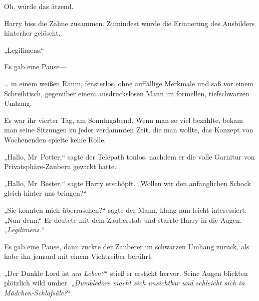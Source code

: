 Oh, würde das ätzend.

Harry biss die Zähne zusammen. Zumindest würde die Erinnerung des Ausbilders hinterher gelöscht.

„Legilimens.“

Es gab eine Pause—

\later

… in einem weißen Raum, fensterlos, ohne auffällige Merkmale und saß vor einem Schreibtisch, gegenüber einem ausdruckslosen Mann im formellen, tiefschwarzen Umhang.

Es war ihr vierter Tag, am Sonntagabend. Wenn man so viel bezahlte, bekam man seine Sitzungen zu jeder verdammten Zeit, die man wollte, das Konzept von Wochenenden spielte keine Rolle.

„Hallo, Mr~Potter,“ sagte der Telepath tonlos, nachdem er die volle Garnitur von Privatsphäre-Zaubern gewirkt hatte.

„Hallo, Mr~Bester,“ sagte Harry erschöpft. „Wollen wir den anfänglichen Schock gleich hinter uns bringen?“

„Sie konnten mich überraschen?“ sagte der Mann, klang nun leicht interessiert. „Nun denn.“ Er deutete mit dem Zauberstab und starrte Harry in die Augen. „\emph{Legilimens.}“

Es gab eine Pause, dann zuckte der Zauberer im schwarzen Umhang zurück, als habe ihn jemand mit einem Viehtreiber berührt.

„Der Dunkle Lord ist \emph{am Leben?}“ stieß er erstickt hervor. Seine Augen blickten plötzlich wild umher. „\emph{Dumbledore macht sich unsichtbar und schleicht sich in Mädchen-Schlafsäle?}“

